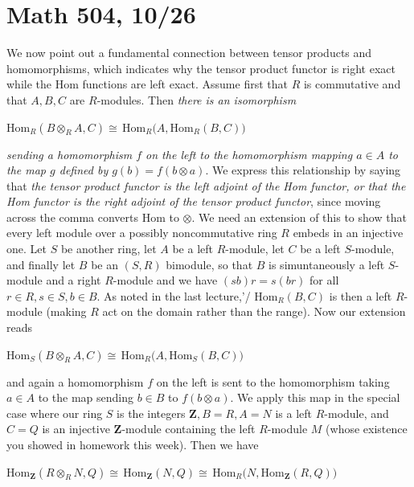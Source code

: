 \documentclass[10pt]{article}
\begin{document}
\section*{Math 504, 10/26}

We now point out a fundamental connection between tensor products and
homomorphisms, which indicates why the tensor product functor is right
exact while the Hom functions are left exact. Assume first that $R$ is
commutative and that $A,B,C$ are $R$-modules. Then {\sl there is an
  isomorphism}

Hom$_R(B\otimes_R A,C)\cong\,$Hom$_R(A,$Hom$_R(B,C))$

{\sl sending a homomorphism $f$ on the left to the homomorphism mapping
  $a\in A$ to the map $g$ defined by $g(b) = f(b\otimes a)$}. We express
this relationship by saying that {\sl the tensor product functor is the
  left adjoint of the Hom functor, or that the Hom functor is the right
  adjoint of the tensor product functor}, since moving across the comma
converts Hom to $\otimes$. We need an extension of this to show that
every left module over a possibly noncommutative ring $R$ embeds in an
injective one. Let $S$ be another ring, let $A$ be a left $R$-module,
let $C$ be a left $S$-module, and finally let $B$ be an $(S,R)$
bimodule, so that $B$ is simuntaneously a left $S$-module and a right
$R$-module and we have $(sb)r = s(br)$ for all $r\in R,s\in S,b\in B$.
As noted in the last lecture,'/ Hom$_R(B,C)$ is then a left $R$-module
(making $R$ act on the domain rather than the range). Now our extension
reads

Hom$_S(B\otimes_R A,C)\cong\,$Hom$_R(A,$Hom$_S(B,C))$

and again a homomorphism $f$ on the left is sent to the homomorphism
taking $a\in A$ to the map sending $b\in B$ to $f(b\otimes a)$. We apply
this map in the special case where our ring $S$ is the integers $\mathbf
Z, B=R, A=N$ is a left $R$-module, and $C=Q$ is an injective $\mathbf
Z$-module containing the left $R$-module $M$ (whose existence you showed
in homework this week). Then we have

Hom$_{\mathbf Z}(R\otimes_R N,Q) \cong\,$Hom$_{\mathbf
  Z}(N,Q)\cong\,$Hom$_R(N,$Hom$_{\mathbf Z} (R,Q))$
\end{document}
